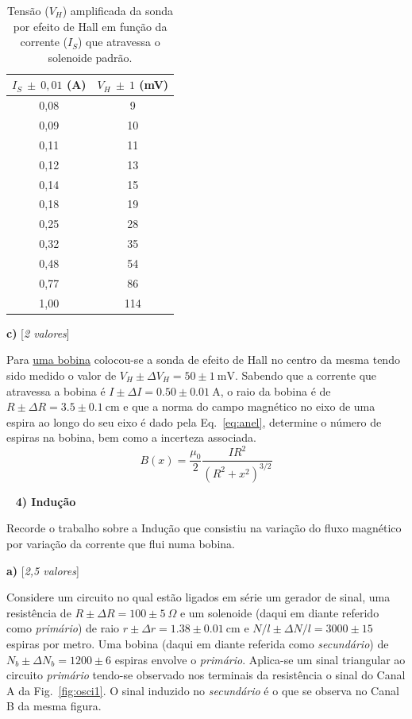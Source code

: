 \documentclass[11pt,a4paper,final]{article}
\begin{document}
\begin{table}[h]
\caption{\label{tab:hall}Tens\~{a}o ($V_H$) amplificada da sonda por efeito de Hall em fun\c{c}\~{a}o da corrente ($I_S$) que atravessa o solenoide padr\~{a}o.}
\begin{center}
\begin{tabular}{|c|c|}
\hline
$I_S~\pm~0,01$ (A) & $V_H~\pm~1$ (mV) \\ \hline
0,08 & 9 \\ 
0,09 & 10 \\ 
0,11 & 11 \\ 
0,12 & 13 \\ 
0,14 & 15 \\ 
0,18 & 19 \\ 
0,25 & 28 \\ 
0,32 & 35 \\ 
0,48 & 54 \\ 
0,77 & 86 \\ 
1,00 & 114 \\ \hline
\end{tabular}
\end{center}
\end{table}

\textbf{c)} \hfill [\textit{2 valores}]

Para \underline{uma bobina} colocou-se a sonda de efeito de Hall no centro da mesma tendo sido medido o valor de $V_H\pm\Delta V_H=50\pm1~\text{mV}$. Sabendo que a corrente que atravessa a bobina é $I\pm\Delta I=0.50\pm0.01~\text{A}$, o raio da bobina é de $R\pm\Delta R=3.5	\pm0.1~\text{cm}$ e que a norma do campo magn\'{e}tico no eixo de uma espira ao longo do seu eixo \'{e} dado pela Eq.~\ref{eq:anel}, determine o n\'{u}mero de espiras na bobina, bem como a incerteza associada.
\begin{equation}
\label{eq:anel}
B\left(x\right)=\frac{\mu_0}{2}\frac{IR^2}{\left(R^2+x^2\right)^{3/2}}
\end{equation}

~\linebreak
\noindent\textbf{4) Indu\c{c}\~{a}o} %

Recorde o trabalho sobre a Indu\c{c}\~{a}o que consistiu na varia\c{c}\~{a}o do fluxo magn\'{e}tico por varia\c{c}\~{a}o da corrente que flui numa bobina.

\textbf{a)} \hfill [\textit{2,5 valores}]

Considere um circuito no qual est\~{a}o ligados em s\'{e}rie um gerador de sinal, uma resist\^{e}ncia de $R\pm\Delta R=100\pm5~\Omega$ e um solenoide (daqui em diante referido como \emph{prim\'{a}rio}) de raio $r\pm\Delta r=1.38\pm0.01~\text{cm}$ e $N/l\pm\Delta N/l=3000\pm15$ espiras por metro. Uma bobina (daqui em diante referida como \emph{secund\'{a}rio}) de $N_b\pm\Delta N_b=1200\pm6$ espiras envolve o \emph{prim\'{a}rio}. Aplica-se um sinal triangular ao circuito \emph{prim\'{a}rio} tendo-se observado nos terminais da resist\^{e}ncia o sinal do Canal A da Fig.~\ref{fig:osci1}. O sinal induzido no \emph{secund\'{a}rio} é o que se observa no Canal B da mesma figura.
\end{document}
